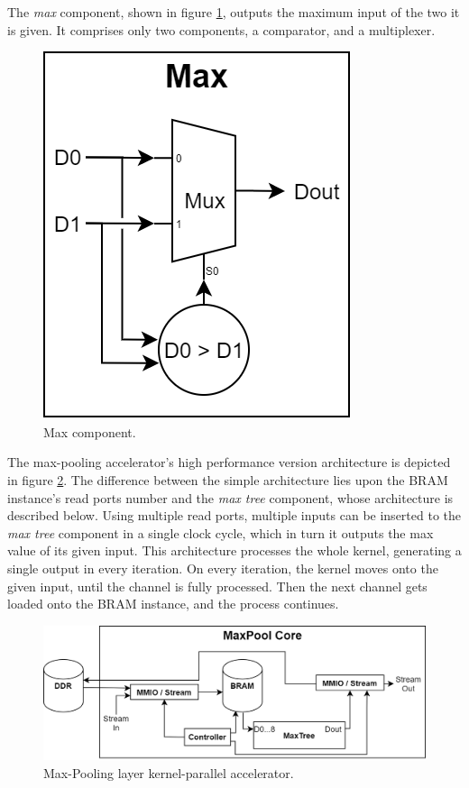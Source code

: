 The \emph{max} component, shown in figure \ref{fig:max-component}, outputs the maximum input of the two it is given. It comprises only two components, a comparator, and a multiplexer.

\begin{figure} [H]
	\centering
	\includegraphics[scale=0.4]{Images/Platform/Max_component.png}
	\decoRule
	\caption[Max component]{Max component.}
	\label{fig:max-component}
\end{figure}

The max-pooling accelerator's high performance version architecture is depicted in figure \ref{fig:max-pool-core-kernel-parallel}. The difference between the simple architecture lies upon the BRAM instance's read ports number and the \emph{max tree} component, whose architecture is described below. Using multiple read ports, multiple inputs can be inserted to the \emph{max tree} component in a single clock cycle, which in turn it outputs the max value of its given input. This architecture processes the whole kernel, generating a single output in every iteration. On every iteration, the kernel moves onto the given input, until the channel is fully processed. Then the next channel gets loaded onto the BRAM instance, and the process continues.

\begin{figure} [H]
	\centering
	\includegraphics[width=\textwidth]{Images/Platform/MaxPool_core_kernel_parallel.png}
	\decoRule
	\caption[Max-Pooling layer kernel-parallel accelerator]{Max-Pooling layer kernel-parallel accelerator.}
	\label{fig:max-pool-core-kernel-parallel}
\end{figure}

